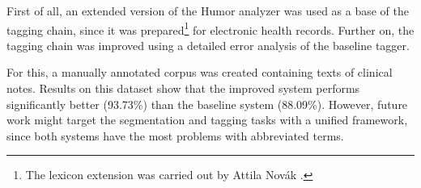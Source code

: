 First of all, an extended version of the Humor analyzer was used as a base of the tagging chain, since it was prepared\footnote{The lexicon extension was carried out by Attila Novák \cite{Orosz2014} .} for electronic health records.
Further on, the tagging chain was improved using a detailed error analysis of the baseline tagger.

For this, a manually annotated corpus was created containing texts of clinical notes.
Results on this dataset show that the improved system performs significantly better (93.73\%) than the baseline system (88.09\%).
However, future work might target the segmentation and tagging tasks with a unified framework, since both systems have the most problems with abbreviated terms.

\let\thesubsection=\oldthesubsection